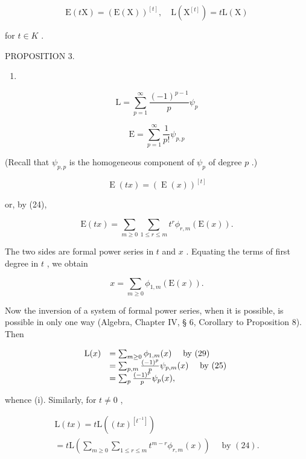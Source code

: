 \[
\mathrm{E} (t \mathrm{X}) = (\mathrm{E} (\mathrm{X})) ^ {[ t ]}, \quad \mathrm{L} (\mathrm{X} ^ {[ t ]}) = t \mathrm{L} (\mathrm{X})
\]

for \(t \in K\) .

PROPOSITION 3.

\begin{enumerate}
\def\labelenumi{(\arabic{enumi})}
\setcounter{enumi}{26}
\tightlist
\item
\end{enumerate}

\[
\mathrm{L} = \sum_ {p = 1} ^ {\infty} \frac {(- 1) ^ {p - 1}}{p} \psi_ {p}\tag{27}
\]

\[
\mathrm{E} = \sum_ {p = 1} ^ {\infty} \frac {1}{p !} \psi_ {p, p}\tag{28}
\]

(Recall that \(\psi_{p,p}\) is the homogeneous component of \(\psi_{p}\) of degree \(p\) .)

\[
\operatorname{E} (t x) = (\operatorname{E} (x)) ^ {[ t ]}
\]

or, by (24),

\[
\mathrm{E} (t x) = \sum_ {m \geqslant 0} \sum_ {1 \leqslant r \leqslant m} t ^ {r} \phi_ {r, m} (\mathrm{E} (x)).
\]

The two sides are formal power series in \(t\) and \(x\) . Equating the terms of first degree in \(t\) , we obtain

\[
x = \sum_ {m \geqslant 0} \phi_ {1, m} (\mathrm{E} (x)).\tag{29}
\]

Now the inversion of a system of formal power series, when it is possible, is possible in only one way (Algebra, Chapter IV, § 6, Corollary to Proposition 8). Then

\[
\begin{array}{r l} \mathrm{L} (x) & = \sum_ {m \geq 0} \phi_ {1, m} (x) \quad \text { by   (29) } \\ & = \sum_ {p, m} \frac {(- 1) ^ {p}}{p} \psi_ {p, m} (x) \quad \text { by   (25) } \\ & = \sum_ {p} \frac {(- 1) ^ {p}}{p} \psi_ {p} (x), \end{array}
\]

whence (i). Similarly, for \(t \neq 0\) ,

\[
\begin{array}{l} \mathrm{L} (t x) = t \mathrm{L} ((t x) ^ {[ t ^ {- 1} ]}) \\ = t \mathrm{L} \left(\sum_ {m \geqslant 0} \sum_ {1 \leqslant r \leqslant m} t ^ {m - r} \phi_ {r, m} (x)\right) \quad \text { by } (24). \end{array}
\]

